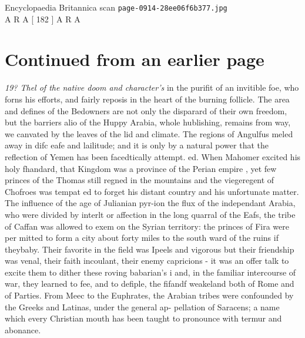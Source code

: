 \documentclass{article}
\begin{document}
\begin{center}
{\Large Encyclopaedia Britannica scan \texttt{page-0914-28ee06f6b377.jpg}}\\[0.5em]
A R A  [ 182 ] A R A
\end{center}
\section*{Continued from an earlier page}
\textit{19? Thel of the native doom and character’s}
in the purifit of an invitible foe, who forns his efforts, and fairly reposis in the heart of the burning follicle. The area and defines of the Bedowners are not only the disparard of their own freedom, but the barriers alio of the Huppy Arabia, whole hublishing, remains from way, we canvated by the leaves of the lid and climate. The regions of Angulfus meled away in difc eafe and lailitude; and it is only by a natural power that the reflection of Yemen has been facedtically attempt. ed. When Mahomer excited his holy fhandard, that Kingdom was a province of the Perian empire , yet few princes of the Thomas still regned in the mountains and the viegeregent of Chofroes was tempat ed to forget his distant country and his unfortunate matter. The influence of the age of Julianian pyr-ion the flux of the independant Arabia, who were divided by interlt or affection in the long quarral of the Eafs, the tribe of Caffan was allowed to exem on the Syrian territory: the princes of Fira were per mitted to form a city about forty miles to the south ward of the ruins if theybaby. Their favorite in the field was Ipeels and vigorous but their friendship was venal, their faith incoulant, their enemy capricions - it was an offer talk to excite them to dither these roving babarian's i and, in the familiar intercourse of war, they learned to fee, and to defiple, the fifandf weakeland both of Rome and of Parties. From Meec to the Euphrates, the Arabian tribes were confounded by the Greeks and Latinas, under the general ap- pellation of Saracens; a name which every Christian mouth has been taught to pronounce with termur and abonance.
\end{document}
